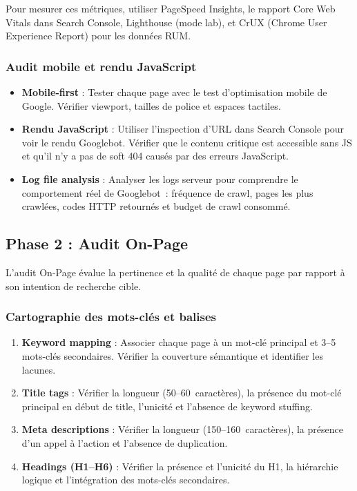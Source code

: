 \documentclass[12pt,a4paper,twoside]{report}
\begin{document}
Pour mesurer ces métriques, utiliser PageSpeed Insights, le rapport Core Web Vitals dans Search Console, Lighthouse (mode lab), et CrUX (Chrome User Experience Report) pour les données RUM.

\subsubsection{Audit mobile et rendu JavaScript}

\begin{itemize}
    \item \textbf{Mobile-first} : Tester chaque page avec le test d'optimisation mobile de Google. Vérifier viewport, tailles de police et espaces tactiles.
    \item \textbf{Rendu JavaScript} : Utiliser l'inspection d'URL dans Search Console pour voir le rendu Googlebot. Vérifier que le contenu critique est accessible sans JS et qu'il n'y a pas de soft 404 causés par des erreurs JavaScript.
    \item \textbf{Log file analysis} : Analyser les logs serveur pour comprendre le comportement réel de Googlebot~: fréquence de crawl, pages les plus crawlées, codes HTTP retournés et budget de crawl consommé.
\end{itemize}

\subsection{Phase 2 : Audit On-Page}

L'audit On-Page évalue la pertinence et la qualité de chaque page par rapport à son intention de recherche cible.

\subsubsection{Cartographie des mots-clés et balises}

\begin{enumerate}
    \item \textbf{Keyword mapping} : Associer chaque page à un mot-clé principal et 3--5 mots-clés secondaires. Vérifier la couverture sémantique et identifier les lacunes.
    \item \textbf{Title tags} : Vérifier la longueur (50--60~caractères), la présence du mot-clé principal en début de title, l'unicité et l'absence de keyword stuffing.
    \item \textbf{Meta descriptions} : Vérifier la longueur (150--160~caractères), la présence d'un appel à l'action et l'absence de duplication.
    \item \textbf{Headings (H1--H6)} : Vérifier la présence et l'unicité du H1, la hiérarchie logique et l'intégration des mots-clés secondaires.
\end{enumerate}
\end{document}
